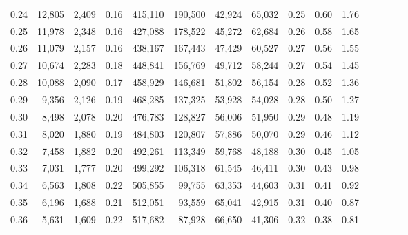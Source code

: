 \begin{tabular}{rrrcrrrrrrrrrrr}
0.24 &  12,805 &  2,409 &                                       0.16 &  415,110 &  190,500 &   42,924 &   65,032 &  0.25 &  0.60 &                         1.76 \\
0.25 &  11,978 &  2,348 &                                       0.16 &  427,088 &  178,522 &   45,272 &   62,684 &  0.26 &  0.58 &                         1.65 \\
0.26 &  11,079 &  2,157 &                                       0.16 &  438,167 &  167,443 &   47,429 &   60,527 &  0.27 &  0.56 &                         1.55 \\
0.27 &  10,674 &  2,283 &                                       0.18 &  448,841 &  156,769 &   49,712 &   58,244 &  0.27 &  0.54 &                         1.45 \\
0.28 &  10,088 &  2,090 &                                       0.17 &  458,929 &  146,681 &   51,802 &   56,154 &  0.28 &  0.52 &                         1.36 \\
0.29 &   9,356 &  2,126 &                                       0.19 &  468,285 &  137,325 &   53,928 &   54,028 &  0.28 &  0.50 &                         1.27 \\
0.30 &   8,498 &  2,078 &                                       0.20 &  476,783 &  128,827 &   56,006 &   51,950 &  0.29 &  0.48 &                         1.19 \\
0.31 &   8,020 &  1,880 &                                       0.19 &  484,803 &  120,807 &   57,886 &   50,070 &  0.29 &  0.46 &                         1.12 \\
0.32 &   7,458 &  1,882 &                                       0.20 &  492,261 &  113,349 &   59,768 &   48,188 &  0.30 &  0.45 &                         1.05 \\
0.33 &   7,031 &  1,777 &                                       0.20 &  499,292 &  106,318 &   61,545 &   46,411 &  0.30 &  0.43 &                         0.98 \\
0.34 &   6,563 &  1,808 &                                       0.22 &  505,855 &   99,755 &   63,353 &   44,603 &  0.31 &  0.41 &                         0.92 \\
0.35 &   6,196 &  1,688 &                                       0.21 &  512,051 &   93,559 &   65,041 &   42,915 &  0.31 &  0.40 &                         0.87 \\
0.36 &   5,631 &  1,609 &                                       0.22 &  517,682 &   87,928 &   66,650 &   41,306 &  0.32 &  0.38 &                         0.81 \\

\end{tabular}
